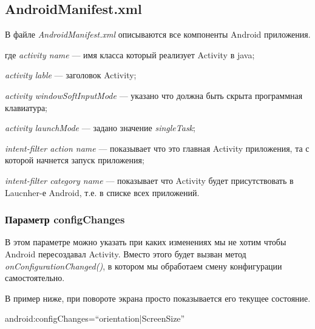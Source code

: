 \subsection{AndroidManifest.xml}

В файле \textit{AndroidManifest.xml} описываются все компоненты Android приложения.
 


\begin{ESKDexplanation}
\item[где ] \textit{activity name} --- имя класса который реализует Activity в java;
\item \textit{activity lable} --- заголовок Activity;
\item \textit{activity windowSoftInputMode} --- указано что должна быть скрыта программная клавиатура;
\item \textit{activity launchMode} --- задано значение \textit{singleTask};
\item \textit{intent-filter action name} --- показывает что это главная Activity приложения, та с которой начнется запуск приложения;
\item \textit{intent-filter category name} --- показывает что Activity будет присутствовать в Laucnher-е Android, т.е. в списке всех приложений. 
\end{ESKDexplanation}

\subsubsection{Параметр configChanges}
	В этом параметре можно указать при каких изменениях мы не хотим чтобы Android пересоздавал Activity. Вместо этого будет вызван метод \textit{onConfigurationChanged()}, в котором мы обработаем смену конфигурации самостоятельно.
	 
	 
В пример ниже, при повороте экрана просто показывается его текущее состояние.
	\begin{center}
	android:configChanges=``orientation|ScreenSize''
	\end{center}
	
	
	
	
